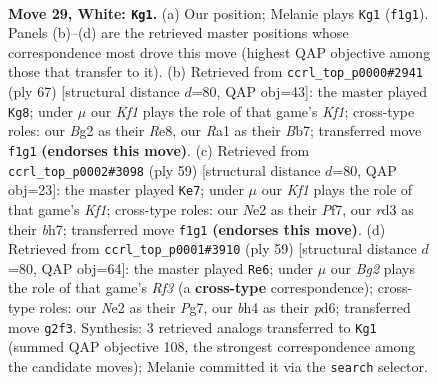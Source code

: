 \documentclass[11pt]{article}
\begin{document}
\clearpage

\begin{figure}[p]\centering
\begin{subfigure}{0.46\textwidth}\centering
\resizebox{\linewidth}{!}{%
\newchessgame
\chessboard[
  setfen={2Q5/pp1n2kp/7p/1P3q2/3P3b/3r4/4N1B1/R4K1R w - - 4 29},
  showmover=false,
  pgfstyle=straightmove, color=movearrow, markmove={f1-g1}
]}
\caption{}
\end{subfigure}\hfill
\begin{subfigure}{0.46\textwidth}\centering
\resizebox{\linewidth}{!}{%
\newchessgame
\chessboard[
  setfen={4rk2/1b6/p3pQ2/1pq5/8/P1N2nP1/1PP1R3/2K5 b - - 4 34},
  showmover=false,
  pgfstyle=straightmove, color=movearrow, markmove={f8-g8}
]}
\caption{}
\end{subfigure}
\\[4pt]
\begin{subfigure}{0.46\textwidth}\centering
\resizebox{\linewidth}{!}{%
\newchessgame
\chessboard[
  setfen={1r3kQ1/5p1B/p2b1p2/8/5P2/4q2P/6PK/5R2 b - - 2 30},
  showmover=false,
  pgfstyle=straightmove, color=movearrow, markmove={f8-e7}
]}
\caption{}
\end{subfigure}\hfill
\begin{subfigure}{0.46\textwidth}\centering
\resizebox{\linewidth}{!}{%
\newchessgame
\chessboard[
  setfen={r7/5kp1/p2P1r2/3Q3p/8/7P/PP1B1P1K/3q4 b - - 5 30},
  showmover=false,
  pgfstyle=straightmove, color=movearrow, markmove={f6-e6}
]}
\caption{}
\end{subfigure}
\caption{\textbf{Move 29, White: \texttt{Kg1}.} (a) Our position; Melanie plays \texttt{Kg1} (\texttt{f1g1}). Panels (b)--(d) are the retrieved master positions whose correspondence most drove this move (highest QAP objective among those that transfer to it). (b) Retrieved from \texttt{ccrl\_top\_p0000\#2941} (ply 67) [structural distance $d$=80, QAP obj=43]: the master played \texttt{Kg8}; under $\mu$ our \emph{Kf1} plays the role of that game's \emph{Kf1}; cross-type roles: our \emph{B}g2 as their \emph{R}e8, our \emph{R}a1 as their \emph{B}b7; transferred move \texttt{f1g1} \textbf{(endorses this move)}. (c) Retrieved from \texttt{ccrl\_top\_p0002\#3098} (ply 59) [structural distance $d$=80, QAP obj=23]: the master played \texttt{Ke7}; under $\mu$ our \emph{Kf1} plays the role of that game's \emph{Kf1}; cross-type roles: our \emph{N}e2 as their \emph{P}f7, our \emph{r}d3 as their \emph{b}h7; transferred move \texttt{f1g1} \textbf{(endorses this move)}. (d) Retrieved from \texttt{ccrl\_top\_p0001\#3910} (ply 59) [structural distance $d$=80, QAP obj=64]: the master played \texttt{Re6}; under $\mu$ our \emph{Bg2} plays the role of that game's \emph{Rf3} (a \textbf{cross-type} correspondence); cross-type roles: our \emph{N}e2 as their \emph{P}g7, our \emph{b}h4 as their \emph{p}d6; transferred move \texttt{g2f3}. Synthesis: 3 retrieved analogs transferred to \texttt{Kg1} (summed QAP objective 108, the strongest correspondence among the candidate moves); Melanie committed it via the \texttt{search} selector.}
\label{fig:thought-m56}
\end{figure}
\end{document}
